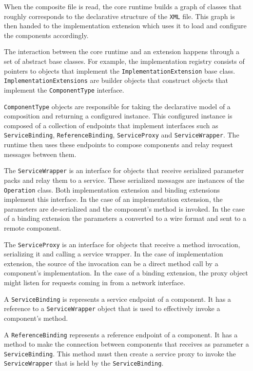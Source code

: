 
When the composite file is read, the core runtime builds a graph of classes that roughly corresponds to the
declarative structure of the \texttt{XML} file. This graph is then handed to the implementation extension which uses it
to load and configure the components accordingly.

The interaction between the core runtime and an extension happens through a set of abstract base classes. For example, the
implementation registry consists of pointers to objects that implement the \texttt{ImplementationExtension} base class.
\texttt{ImplementationExtensions} are builder objects that construct objects that implement the \texttt{ComponentType}
interface.

\texttt{ComponentType} objects are responsible for taking the declarative model of a composition and returning a configured
instance. This configured instance is composed of a collection of endpoints that implement interfaces such as
\texttt{ServiceBinding}, \texttt{ReferenceBinding}, \texttt{ServiceProxy} and \texttt{ServiceWrapper}. The
runtime then uses these endpoints to compose components and relay request messages between them.

The \texttt{ServiceWrapper} is an interface for objects that receive serialized parameter packs and relay them to a service.
These serialized messages are instances of the \texttt{Operation} class. Both implementation extension and binding extensions
implement this interface. In the case of an implementation extension, the parameters are de-serialized and the component's
method is invoked. In the case of a binding extension the parameters a converted to a wire format and sent to a remote component. 

The \texttt{ServiceProxy} is an interface for objects that receive a method invocation, serializing it and
calling a service wrapper. In the case of implementation extension, the source of the invocation can be a direct method
call by a component's implementation. In the case of a binding extension, the proxy object might listen for requests coming
in from a network interface.

A \texttt{ServiceBinding} is represents a service endpoint of a component. It has a reference to a \texttt{ServiceWrapper}
object that is used to effectively invoke a component's method.

A \texttt{ReferenceBinding} represents a reference endpoint of a component. It has a method to make the connection
between components that receives as parameter a \texttt{ServiceBinding}. This method must then create a service proxy
to invoke the \texttt{ServiceWrapper} that is held by the \texttt{ServiceBinding}.

